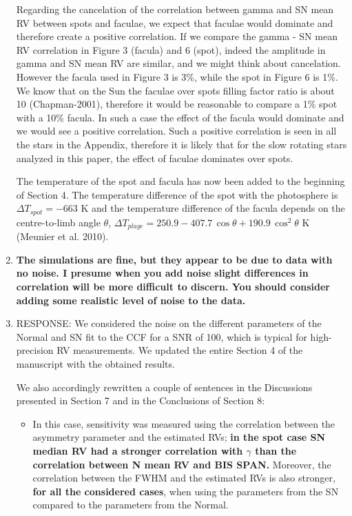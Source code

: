\documentclass[11pt]{article}   	%
\begin{document}
\begin{enumerate}
Regarding the cancelation of the correlation between gamma and SN mean RV between spots and faculae, we expect that faculae would dominate and therefore create a positive correlation. 
If we compare the gamma - SN mean RV correlation in Figure 3 (facula) and 6 (spot), indeed the amplitude in gamma and SN mean RV are similar, and we might think about cancelation. 
However the facula used in Figure 3 is 3\%, while the spot in Figure 6 is 1\%. 
We know that on the Sun the faculae over spots filling factor ratio is about 10 (Chapman-2001), therefore it would be reasonable to compare a 1\% spot with a 10\% facula. In such a case the effect of the facula would dominate and we would see a positive correlation. Such a positive correlation is seen in all the stars in the Appendix, therefore it is likely that for the slow rotating stars analyzed in this paper, the effect of faculae dominates over spots.

The temperature of the spot and facula has now been added to the beginning of Section 4. The temperature difference of the spot with the photosphere is $\Delta T_{spot} = -663$ K and the temperature difference of the facula depends on the centre-to-limb angle $\theta$,  $\Delta T_{plage} = 250.9 - 407.7\,\cos{\theta} + 190.9\,\cos^2 \theta$ K (Meunier et al. 2010).
\bigskip
%
%
\item {\bf The simulations are fine, but they appear to be due to data with no noise. I presume when you add noise slight differences in correlation will be more difficult to discern. You should consider adding some realistic level of noise to the data.}
%
\item[]  RESPONSE:  We considered the noise on the different parameters of the Normal and SN fit to the CCF for a SNR of 100, which is typical for high-precision RV measurements. We updated the entire Section 4 of the manuscript with the obtained results. 

We also accordingly rewritten a couple of sentences in the Discussions presented in Section 7 and in the Conclusions of Section 8:
\begin{itemize}
\item In this case, sensitivity was measured using the correlation between the asymmetry parameter and the estimated RVs; {\bf{in the spot case SN median RV had a stronger correlation with $\gamma$ than the correlation between N mean RV and BIS SPAN.}} Moreover, the correlation between the FWHM and the estimated RVs is also stronger, {\bf{for all the considered cases}}, when using the parameters from the SN compared to the parameters from the Normal. 


\end{itemize}
\end{enumerate}
\end{document}
